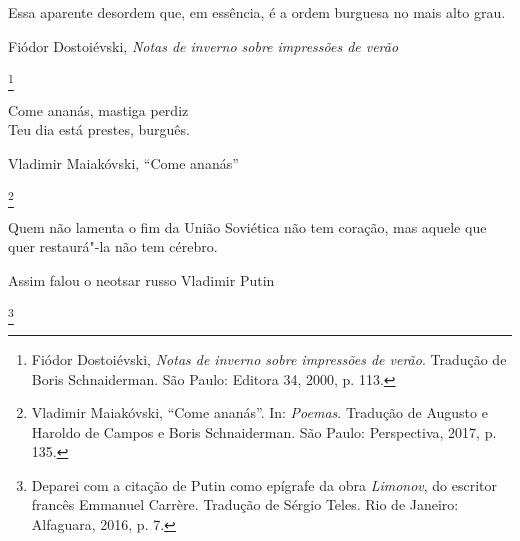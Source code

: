 \chapter*{}

\vspace*{\fill}

\thispagestyle{empty}

\epigraph{Essa aparente desordem que, em essência, é a ordem burguesa no mais alto grau.}{Fiódor Dostoiévski, \emph{Notas de inverno sobre impressões de verão}}\footnote{Fiódor Dostoiévski, \emph{Notas de inverno sobre impressões de verão}. Tradução de Boris Schnaiderman. São Paulo: Editora 34, 2000, p. 113.}

\epigraph{Come ananás, mastiga perdiz\\ Teu dia está prestes, burguês.}{Vladimir Maiakóvski, ``Come ananás''}\footnote{Vladimir Maiakóvski, ``Come ananás''. In: \emph{Poemas}. Tradução de Augusto e Haroldo de Campos e Boris Schnaiderman. São Paulo: Perspectiva, 2017, p. 135.}

\epigraph{Quem não lamenta o fim da União Soviética não tem coração, mas aquele que quer restaurá"-la não tem cérebro.}{Assim falou o neotsar russo Vladimir Putin}\footnote{Deparei com a citação de Putin como epígrafe da obra \emph{Limonov}, do escritor francês Emmanuel Carrère. Tradução de Sérgio Teles. Rio de Janeiro: Alfaguara, 2016, p. 7.}